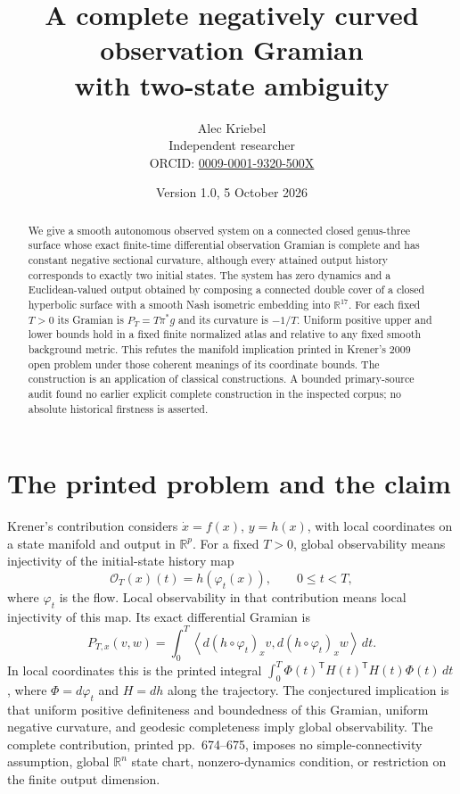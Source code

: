 \documentclass[11pt]{article}
\title{A complete negatively curved observation Gramian\protect\\with two-state ambiguity}
\author{Alec Kriebel\protect\\Independent researcher\protect\\
\small ORCID: \href{https://orcid.org/0009-0001-9320-500X}{0009-0001-9320-500X}}
\date{Version 1.0, 5 October 2026}
\newcommand{\R}{\mathbb R}
\newcommand{\Obs}{\mathcal O}
\begin{document}
\maketitle
\begin{abstract}
We give a smooth autonomous observed system on a connected closed genus-three
surface whose exact finite-time differential observation Gramian is complete
and has constant negative sectional curvature, although every attained output
history corresponds to exactly two initial states. The system has zero dynamics
and a Euclidean-valued output obtained by composing a connected double cover of
a closed hyperbolic surface with a smooth Nash isometric embedding into
$\R^{17}$. For each fixed $T>0$ its Gramian is $P_T=T\pi^*g$ and its curvature is
$-1/T$. Uniform positive upper and lower bounds hold in a fixed finite
normalized atlas and relative to any fixed smooth background metric. This
refutes the manifold implication printed in Krener's 2009 open problem under
those coherent meanings of its coordinate bounds. The construction is an application of classical constructions. A bounded
primary-source audit found no earlier explicit complete construction in the
inspected corpus; no absolute historical firstness is asserted.
\end{abstract}

\section{The printed problem and the claim}
Krener's contribution \cite{krener} considers $\dot x=f(x)$, $y=h(x)$,
with local coordinates on a state manifold and output in $\R^p$. For a fixed
$T>0$, global observability means injectivity of the initial-state history map
\[
 \Obs_T(x)(t)=h(\varphi_t(x)),\qquad 0\leq t<T,
\]
where $\varphi_t$ is the flow. Local observability in that contribution means
local injectivity of this map. Its exact differential Gramian is
\begin{equation}\label{eq:gramian}
 P_{T,x}(v,w)=\int_0^T
 \left\langle d(h\circ\varphi_t)_x v,
 d(h\circ\varphi_t)_x w\right\rangle\,dt.
\end{equation}
In local coordinates this is the printed integral
$\int_0^T\Phi(t)^\mathsf{T}H(t)^\mathsf{T}H(t)\Phi(t)\,dt$,
where $\Phi=d\varphi_t$ and $H=dh$ along the trajectory. The conjectured
implication is that uniform positive definiteness and boundedness of this
Gramian, uniform negative curvature, and geodesic completeness imply global
observability. The complete contribution, printed pp.~674--675, imposes no
simple-connectivity assumption, global $\R^n$ state chart, nonzero-dynamics
condition, or restriction on the finite output dimension.
\end{document}
